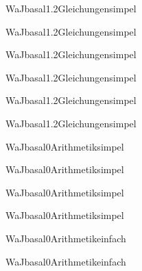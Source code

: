\documentclass[12pt]{article}
\begin{document}
\begin{Add}{WaJ}{basal1.2}{Gleichungen}{simpel}
\solution{ }
\end{Add}
\begin{Add}{WaJ}{basal1.2}{Gleichungen}{simpel}
\end{Add}

\begin{Add}{WaJ}{basal1.2}{Gleichungen}{simpel}
\solution{ }
\end{Add}
\begin{Add}{WaJ}{basal1.2}{Gleichungen}{simpel}
\end{Add}

\begin{Add}{WaJ}{basal1.2}{Gleichungen}{simpel}
\solution{ }
\end{Add}
\begin{Add}{WaJ}{basal1.2}{Gleichungen}{simpel}
\end{Add}

\begin{Add}{WaJ}{basal0}{Arithmetik}{simpel}
\solution{ }
\end{Add}
\begin{Add}{WaJ}{basal0}{Arithmetik}{simpel}
\end{Add}

\begin{Add}{WaJ}{basal0}{Arithmetik}{simpel}
\solution{ }
\end{Add}
\begin{Add}{WaJ}{basal0}{Arithmetik}{simpel}
\end{Add}

\begin{Add}{WaJ}{basal0}{Arithmetik}{einfach}
\solution{ }
\end{Add}
\begin{Add}{WaJ}{basal0}{Arithmetik}{einfach}
\end{Add}
\end{document}
